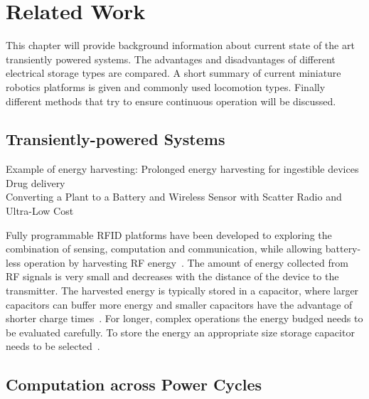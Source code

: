 \chapter{Related Work}
\label{chp:related_work}

This chapter will provide background information about current state of the art transiently powered systems. The advantages and disadvantages of different electrical storage types are compared. A short summary of current miniature robotics platforms is given and commonly used locomotion types. Finally different methods that try to ensure continuous operation will be discussed.

\section{Transiently-powered Systems}
\label{sec:tp_systems}


Example of energy harvesting: Prolonged energy harvesting for ingestible devices~\cite{plonski_tranro_2016}
Drug delivery
\\
Converting a Plant to a Battery and Wireless Sensor with Scatter Radio and Ultra-Low Cost


Fully programmable RFID platforms have been developed to exploring the combination of sensing, computation and communication, while allowing battery-less operation by harvesting RF energy~\cite{sample_transim_2008}.
The amount of energy collected from RF signals is very small and decreases with the distance of the device to the transmitter.
The harvested energy is typically stored in a capacitor, where larger capacitors can buffer more energy and smaller capacitors have the advantage of shorter charge times~\cite{gummerson_mobisys_2010}.
For longer, complex operations the energy budged needs to be evaluated carefully.
To store the energy an appropriate size storage capacitor needs to be selected~\cite{naderiparizi_rfid_2015}.

\section{Computation across Power Cycles}
\label{sec:comp_pc} 

